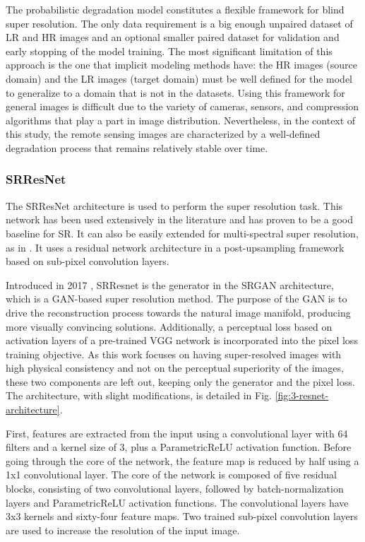     The probabilistic degradation model constitutes a flexible framework for blind super resolution. 
    The only data requirement is a big enough unpaired dataset of LR and HR images and an optional smaller paired dataset for validation and early stopping of the model training.
    The most significant limitation of this approach is the one that implicit modeling methods have: the HR images (source domain) and the LR images (target domain) must be well defined for the model to generalize to a domain that is not in the datasets. 
    Using this framework for general images is difficult due to the variety of cameras, sensors, and compression algorithms that play a part in image distribution. Nevertheless, in the context of this study, the remote sensing images are characterized by a well-defined degradation process that remains relatively stable over time.


\subsubsection{SRResNet}

    
    The SRResNet architecture is used to perform the super resolution task. This network has been used extensively in the literature and has proven to be a good baseline for SR. It can also be easily extended for multi-spectral super resolution, as in \cite{myself2023}. It uses a residual network architecture in a post-upsampling framework based on sub-pixel convolution layers.
    
    Introduced in 2017 \cite{ledig2017photorealistic}, SRResnet is the generator in the SRGAN architecture, which is a GAN-based super resolution method. The purpose of the GAN is to drive the reconstruction process towards the natural image manifold, producing more visually convincing solutions. Additionally, a perceptual loss based on activation layers of a pre-trained VGG network \cite{simonyan2015deep} is incorporated into the pixel loss training objective. As this work focuses on having super-resolved images with high physical consistency and not on the perceptual superiority of the images, these two components are left out,  keeping only the generator and the pixel loss. The architecture, with slight modifications, is detailed in Fig. \ref{fig:3-resnet-architecture}.

    First, features are extracted from the input using a convolutional layer with 64 filters and a kernel size of 3, plus a ParametricReLU activation function.
    Before going through the core of the network, the feature map is reduced by half using a 1x1 convolutional layer.
    The core of the network is composed of five residual blocks, consisting of two convolutional layers, followed by batch-normalization layers and ParametricReLU activation functions. 
    The convolutional layers have 3x3 kernels and sixty-four feature maps. 
    Two trained sub-pixel convolution layers are used to increase the resolution of the input image.

